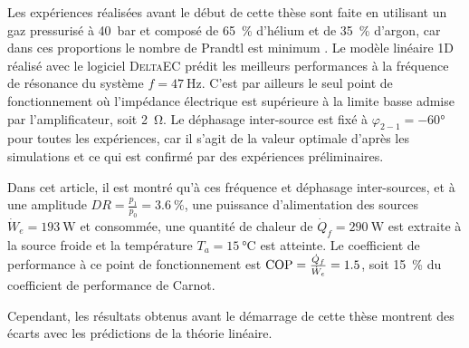 Les expériences réalisées avant le début de cette thèse sont faite en utilisant un gaz pressurisé à \qty{40}{\bar} et composé de \qty{65}{\percent} d'hélium et de \qty{35}{\percent} d'argon, car dans ces proportions le nombre de Prandtl est minimum \cite{belcher_working_1999}. Le modèle linéaire 1D réalisé avec le logiciel  \textsc{DeltaEC} prédit les meilleurs performances à la fréquence de résonance du système $f=\qty{47}{\hertz}$. C'est par ailleurs le seul point de fonctionnement où l'impédance électrique est supérieure à la limite basse admise par l'amplificateur, soit \qty{2}{\ohm}. Le déphasage inter-source est fixé à $\varphi_{2-1}=\ang{-60}$ pour toutes les expériences, car il s'agit de la valeur optimale d'après les simulations et ce qui est confirmé par des expériences préliminaires.

Dans cet article, il est montré qu'à ces fréquence et déphasage inter-sources, et à une amplitude $DR=\frac{p_1}{p_0}=\qty{3.6}{\percent}$, une puissance d'alimentation des sources $\dot W_e=\qty{193}{\watt}$ et consommée, une quantité de chaleur de $\dot Q_f=\qty{290}{\watt}$ est extraite à la source froide et la température $T_a=\qty{15}{\degreeCelsius}$ est atteinte. Le coefficient de performance à ce point de fonctionnement est $\mathrm{COP}=\frac{\dot Q_f}{\dot W_e}=\num{1.5}$, soit \qty{15}{\percent} du coefficient de performance de Carnot.\smallskip

Cependant, les résultats obtenus avant le démarrage de cette thèse montrent des écarts avec les prédictions de la théorie linéaire.

